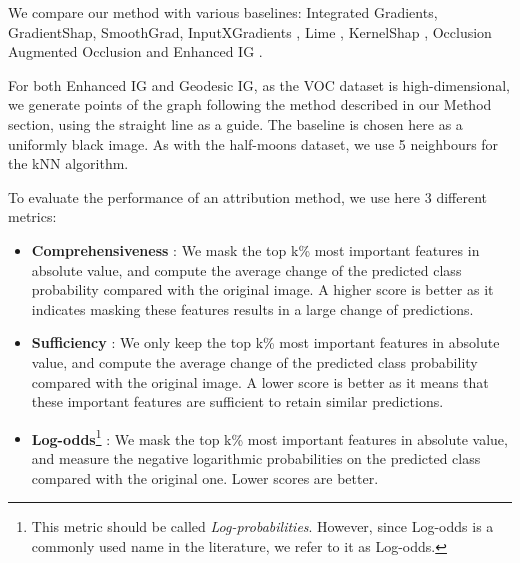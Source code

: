 We compare our method with various baselines: Integrated Gradients, GradientShap, SmoothGrad, InputXGradients \citep{shrikumar2016not}, Lime \citep{ribeiro2016should}, KernelShap \citep{lundberg2017unified}, Occlusion \citep{zeiler2014visualizing} Augmented Occlusion \citep{tonekaboni2020went} and Enhanced IG \citep{jha2020enhanced}.

For both Enhanced IG and Geodesic IG, as the VOC dataset is high-dimensional, we generate points of the graph following the method described in our Method section, using the straight line as a guide. The baseline is chosen here as a uniformly black image. As with the half-moons dataset, we use 5 neighbours for the kNN algorithm.

To evaluate the performance of an attribution method, we use here 3 different metrics:

\begin{itemize}
    \item \textbf{Comprehensiveness} \citep{deyoung2019eraser}: We mask the top k\% most important features in absolute value, and compute the average change of the predicted class probability compared with the original image. A higher score is better as it indicates masking these features results in a large change of predictions.
    \item \textbf{Sufficiency} \citep{deyoung2019eraser}: We only keep the top k\% most important features in absolute value, and compute the average change of the predicted class probability compared with the original image. A lower score is better as it means that these important features are sufficient to retain similar predictions.
    \item \textbf{Log-odds}\footnote{This metric should be called \emph{Log-probabilities}. However, since Log-odds is a commonly used name in the literature, we refer to it as Log-odds.} \citep{shrikumar2017learning}: We mask the top k\% most important features in absolute value, and measure the negative logarithmic probabilities on the predicted class compared with the original one. Lower scores are better.
\end{itemize}

